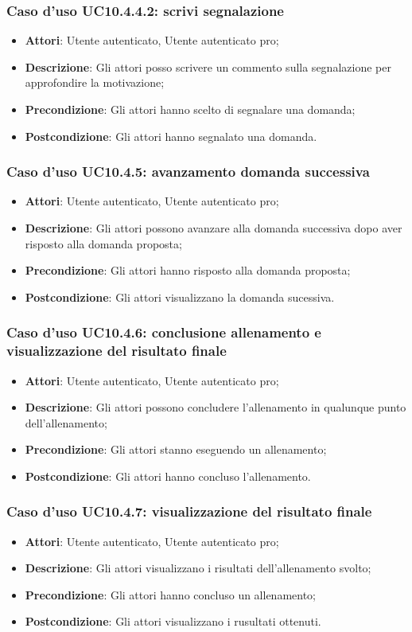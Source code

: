 \subsubsection{Caso d'uso UC10.4.4.2: scrivi segnalazione}
	\begin{itemize}
		\item \textbf{Attori}: Utente autenticato, Utente autenticato pro;
		\item \textbf{Descrizione}: Gli attori posso scrivere un commento sulla segnalazione per approfondire la motivazione;
		\item \textbf{Precondizione}: Gli attori hanno scelto di segnalare una domanda;
		\item \textbf{Postcondizione}: Gli attori hanno segnalato una domanda.
	\end{itemize}
\subsubsection{Caso d'uso UC10.4.5: avanzamento domanda successiva}
	\begin{itemize}
		\item \textbf{Attori}: Utente autenticato, Utente autenticato pro;
		\item \textbf{Descrizione}: Gli attori possono avanzare alla domanda successiva dopo aver risposto alla domanda proposta; 
		\item \textbf{Precondizione}: Gli attori hanno risposto alla domanda proposta;
		\item \textbf{Postcondizione}: Gli attori visualizzano la domanda sucessiva.
	\end{itemize}
\subsubsection{Caso d'uso UC10.4.6: conclusione allenamento e visualizzazione del risultato finale}
	\begin{itemize}
		\item \textbf{Attori}: Utente autenticato, Utente autenticato pro;
		\item \textbf{Descrizione}: Gli attori possono concludere l'allenamento in qualunque punto dell'allenamento;
		\item \textbf{Precondizione}: Gli attori stanno eseguendo un allenamento;
		\item \textbf{Postcondizione}: Gli attori hanno concluso l'allenamento.
	\end{itemize}
\subsubsection{Caso d'uso UC10.4.7: visualizzazione del risultato finale}
	\begin{itemize}
		\item \textbf{Attori}: Utente autenticato, Utente autenticato pro;
		\item \textbf{Descrizione}: Gli attori visualizzano i risultati dell'allenamento svolto;
		\item \textbf{Precondizione}: Gli attori hanno concluso un allenamento;
		\item \textbf{Postcondizione}: Gli attori visualizzano i rusultati ottenuti.
	\end{itemize}
